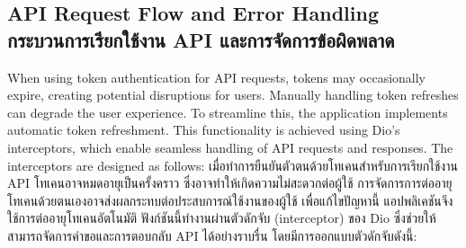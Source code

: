 \subsection{\ifenglish API Request Flow and Error Handling \else กระบวนการเรียกใช้งาน API และการจัดการข้อผิดพลาด \fi}

\ifenglish
When using token authentication for API requests, tokens may occasionally expire, creating potential disruptions for users. Manually handling token refreshes can degrade the user experience. To streamline this, the application implements automatic token refreshment. This functionality is achieved using Dio’s interceptors, which enable seamless handling of API requests and responses. The interceptors are designed as follows:
\else
เมื่อทำการยืนยันตัวตนด้วยโทเคนสำหรับการเรียกใช้งาน API โทเคนอาจหมดอายุเป็นครั้งคราว ซึ่งอาจทำให้เกิดความไม่สะดวกต่อผู้ใช้ การจัดการการต่ออายุโทเคนด้วยตนเองอาจส่งผลกระทบต่อประสบการณ์ใช้งานของผู้ใช้ เพื่อแก้ไขปัญหานี้ แอปพลิเคชันจึงใช้การต่ออายุโทเคนอัตโนมัติ ฟังก์ชันนี้ทำงานผ่านตัวดักจับ (interceptor) ของ Dio ซึ่งช่วยให้สามารถจัดการคำขอและการตอบกลับ API ได้อย่างราบรื่น โดยมีการออกแบบตัวดักจับดังนี้:
\fi

